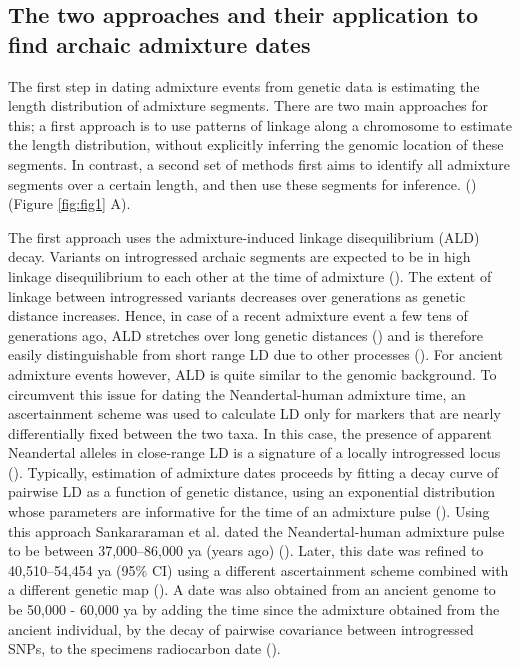 \documentclass[]{article}
\begin{document}
\subsection{The two approaches and their application to find archaic admixture dates}\label{the-two-approaches-and-their-application-to-find-archaic-admixture-dates}

The first step in dating admixture events from genetic data is estimating the length distribution of admixture segments.  There are two main approaches for this; a first approach is to use patterns of linkage along a chromosome to estimate the length distribution, without explicitly inferring the genomic location of these segments. In contrast, a second set of methods first aims to identify all admixture segments over a certain length, and then use these segments for inference. 
(\cite{chimusa_dating_2018}) (Figure \ref{fig:fig1} A).

The first approach uses the admixture-induced linkage disequilibrium
(ALD) decay. Variants on introgressed archaic segments are
expected to be in high linkage disequilibrium to each other at the time
of admixture
(\cite{chakraborty_admixture_1988,stephens_mapping_1994,wall_detecting_2000}). The extent of linkage between introgressed variants decreases over generations as genetic distance increases. Hence, in case of a recent
admixture event a few tens of generations ago, ALD stretches  over long genetic distances
(\cite{patterson_methods_2004}) and is therefore easily distinguishable
from short range LD due to other processes (\cite{moorjani_history_2011}). For ancient
admixture events however, ALD is quite similar to the genomic background. To circumvent this issue for dating the Neandertal-human admixture time, an ascertainment scheme was used to calculate LD only for markers that are nearly differentially fixed between the two taxa. In this case, the presence of apparent Neandertal alleles in close-range LD is a signature of a locally introgressed locus
(\cite{sankararaman_date_2012}). Typically, estimation of admixture dates proceeds by fitting a decay curve of pairwise LD as a function of
genetic distance, using an exponential distribution whose parameters are informative for the time of an admixture pulse
(\cite{moorjani_history_2011,loh_inferring_2013}). Using this approach Sankararaman et al. dated the Neandertal-human admixture pulse to
be  between 37,000--86,000 ya (years ago) (\cite{sankararaman_date_2012}). Later,
this date was refined to 40,510--54,454 ya (95\% CI) using a different
ascertainment scheme combined with a different genetic map
(\cite{moorjani_genetic_2016}). A date was also obtained from an ancient
genome to be 50,000 - 60,000 ya by adding the time since the admixture obtained from the
ancient individual, by the decay of pairwise covariance between
introgressed SNPs, to the specimens radiocarbon date
(\cite{fu_genome_2014}).
\end{document}
